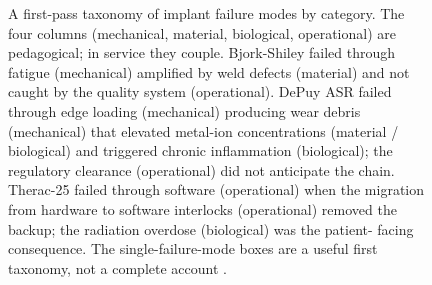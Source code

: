 \begin{figure}[htbp]
\caption[Implant failure-mode tree]{A first-pass taxonomy of
implant failure modes by category. The four columns (mechanical,
material, biological, operational) are pedagogical; in service
they couple. Bjork-Shiley failed through fatigue (mechanical)
amplified by weld defects (material) and not caught by the
quality system (operational). DePuy ASR failed through edge
loading (mechanical) producing wear debris (mechanical) that
elevated metal-ion concentrations (material / biological) and
triggered chronic inflammation (biological); the regulatory
clearance (operational) did not anticipate the chain. Therac-25
failed through software (operational) when the migration from
hardware to software interlocks (operational) removed the
backup; the radiation overdose (biological) was the patient-
facing consequence. The single-failure-mode boxes are a useful
first taxonomy, not a complete account
\cite{text:v6c12-ratner-biomaterials-2020,
paper:v6c12-cohen-mom-bmj-2012}.}
\label{fig:vol06:ch12:failure-tree}
\end{figure}
